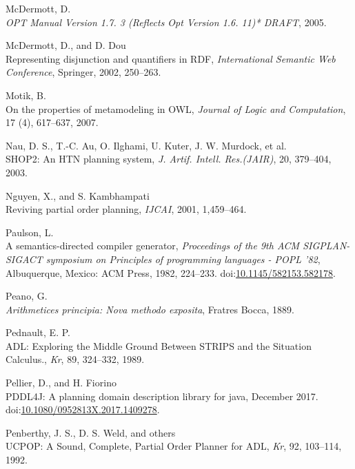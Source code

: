 \documentclass[11pt,a4paper,twoside,openright,titlepage,numbers=noenddot,headinclude,cleardoublepage=empty,openany]{scrreprt}
\theoremstyle{plain}
\theoremstyle{definition}
\theoremstyle{remark}
\begin{document}
\leavevmode\hypertarget{ref-mcdermott_opt_2005}{}%
McDermott, D.\\
\emph{OPT Manual Version 1.7. 3 (Reflects Opt Version 1.6. 11)* DRAFT},
2005.

\leavevmode\hypertarget{ref-mcdermott_representing_2002}{}%
McDermott, D., and D. Dou\\
Representing disjunction and quantifiers in RDF, \emph{International
Semantic Web Conference}, Springer, 2002, 250--263.

\leavevmode\hypertarget{ref-motik_properties_2007}{}%
Motik, B.\\
On the properties of metamodeling in OWL, \emph{Journal of Logic and
Computation}, 17 (4), 617--637, 2007.

\leavevmode\hypertarget{ref-nau_shop2_2003}{}%
Nau, D. S., T.-C. Au, O. Ilghami, U. Kuter, J. W. Murdock, et al.\\
SHOP2: An HTN planning system, \emph{J. Artif. Intell. Res.(JAIR)}, 20,
379--404, 2003.

\leavevmode\hypertarget{ref-nguyen_reviving_2001}{}%
Nguyen, X., and S. Kambhampati\\
Reviving partial order planning, \emph{IJCAI}, 2001, 1,459--464.

\leavevmode\hypertarget{ref-paulson_semanticsdirected_1982}{}%
Paulson, L.\\
A semantics-directed compiler generator, \emph{Proceedings of the 9th
ACM SIGPLAN-SIGACT symposium on Principles of programming languages -
POPL '82}, Albuquerque, Mexico: ACM Press, 1982, 224--233.
doi:\href{https://doi.org/10.1145/582153.582178}{10.1145/582153.582178}.

\leavevmode\hypertarget{ref-peano_arithmetices_1889}{}%
Peano, G.\\
\emph{Arithmetices principia: Nova methodo exposita}, Fratres Bocca,
1889.

\leavevmode\hypertarget{ref-pednault_adl_1989}{}%
Pednault, E. P.\\
ADL: Exploring the Middle Ground Between STRIPS and the Situation
Calculus., \emph{Kr}, 89, 324--332, 1989.

\leavevmode\hypertarget{ref-pellier_pddl4j_2017}{}%
Pellier, D., and H. Fiorino\\
PDDL4J: A planning domain description library for java, December 2017.
doi:\href{https://doi.org/10.1080/0952813X.2017.1409278}{10.1080/0952813X.2017.1409278}.

\leavevmode\hypertarget{ref-penberthy_ucpop_1992}{}%
Penberthy, J. S., D. S. Weld, and others\\
UCPOP: A Sound, Complete, Partial Order Planner for ADL, \emph{Kr}, 92,
103--114, 1992.
\end{document}
